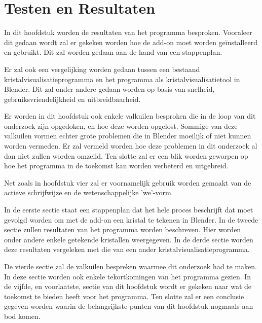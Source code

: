 

\chapter{Testen en Resultaten}  

In dit hoofdstuk worden de resultaten van het programma besproken. Vooraleer dit gedaan wordt zal er gekeken worden hoe de add-on moet worden geïnstalleerd en gebruikt. Dit zal worden gedaan aan de hand van een stappenplan.
\par
Er zal ook een vergelijking worden gedaan tussen een bestaand kristalvisualisatieprogramma en het programma als kristalvisualisatietool in Blender. Dit zal onder andere gedaan worden op basis van snelheid, gebruiksvriendelijkheid en uitbreidbaarheid.
\par
Er worden in dit hoofdstuk ook enkele valkuilen besproken die in de loop van dit onderzoek zijn opgedoken, en hoe deze worden opgelost. Sommige van deze valkuilen vormen echter grote problemen die in Blender moeilijk of niet kunnen worden vermeden. Er zal vermeld worden hoe deze problemen in dit onderzoek al dan niet zullen worden omzeild. Ten slotte zal er een blik worden geworpen op hoe het programma in de toekomst kan worden verbeterd en uitgebreid.
\par
Net zoals in hoofdstuk vier zal er voornamelijk gebruik worden gemaakt van de actieve schrijfwijze en de wetenschappelijke 'we'-vorm. 
\par 
In de eerste sectie staat een stappenplan dat het hele proces beschrijft dat moet gevolgd worden om met de add-on een kristal te tekenen in Blender. In de tweede sectie zullen resultaten van het programma worden beschreven. Hier worden onder andere enkele getekende kristallen weergegeven. In de derde sectie worden deze resultaten vergeleken met die van een ander kristalvisualisatieprogramma. 
\par
De vierde sectie zal de valkuilen bespreken waarmee dit onderzoek had te maken. In deze sectie worden ook enkele tekortkomingen van het programma gezien. In de vijfde, en voorlaatste, sectie van dit hoofdstuk wordt er gekeken naar wat de toekomst te bieden heeft voor het programma. Ten slotte zal er een conclusie gegeven worden waarin de belangrijkste punten van dit hoofdstuk nogmaals aan bod komen.   



